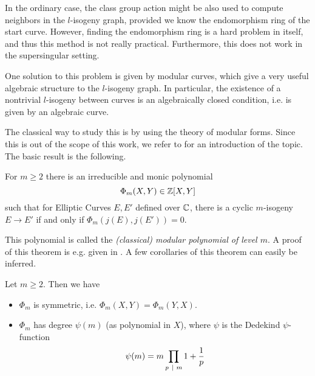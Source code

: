 In the ordinary case, the class group action might be also used to compute neighbors in the $l$-isogeny graph, provided we know the endomorphism ring of the start curve.
However, finding the endomorphism ring is a hard problem in itself, and thus this method is not really practical.
Furthermore, this does not work in the supersingular setting.

One solution to this problem is given by modular curves, which give a very useful algebraic structure to the $l$-isogeny graph.
In particular, the existence of a nontrivial $l$-isogeny between curves is an algebraically closed condition, i.e. is given by an algebraic curve.

The classical way to study this is by using the theory of modular forms.
Since this is out of the scope of this work, we refer to \cite[§11]{cox_primes_of_form} for an introduction of the topic.
The basic result is the following.
\begin{theorem}
    \label{prop:complex_mod_poly}
    For $m \geq 2$ there is an irreducible and monic polynomial
    \begin{equation*}
        \Phi_m(X, Y) \in \mathbb{Z}[X, Y]
    \end{equation*}
    such that for Elliptic Curves $E, E'$ defined over $\mathbb{C}$, there is a cyclic $m$-isogeny $E \to E'$ if and only if $\Phi_m(j(E), j(E')) = 0$.
\end{theorem}
This polynomial is called the \emph{(classical) modular polynomial of level $m$}.
A proof of this theorem is e.g. given in \cite[Thm~11.18]{cox_primes_of_form}.
A few corollaries of this theorem can easily be inferred.
\begin{corollary}
    Let $m \geq 2$. Then we have
    \begin{itemize}
        \item $\Phi_m$ is symmetric, i.e. $\Phi_m(X, Y) = \Phi_m(Y, X)$.
        \item $\Phi_m$ has degree $\psi(m)$ (as polynomial in $X$), where $\psi$ is the Dedekind $\psi$-function
        \begin{equation*}
            \psi(m) = m \prod_{p \ \mid \  m} 1 + \frac 1 p
        \end{equation*}
    \end{itemize}
\end{corollary}
